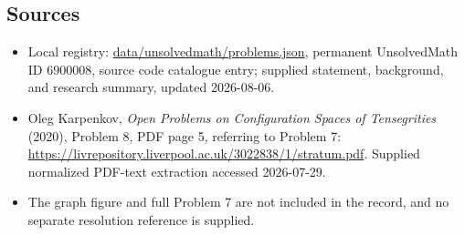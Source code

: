 \documentclass[11pt]{article}
\begin{document}
\subsection{Sources}
\begin{itemize}
\item Local registry: \url{data/unsolvedmath/problems.json}, permanent UnsolvedMath ID \(6900008\), source code catalogue entry; supplied statement, background, and research summary, updated 2026-08-06.
\item Oleg Karpenkov, \emph{Open Problems on Configuration Spaces of Tensegrities} (2020), Problem 8, PDF page 5, referring to Problem 7: \url{https://livrepository.liverpool.ac.uk/3022838/1/stratum.pdf}. Supplied normalized PDF-text extraction accessed 2026-07-29.
\item The graph figure and full Problem 7 are not included in the record, and no separate resolution reference is supplied.
\end{itemize}
\end{document}
